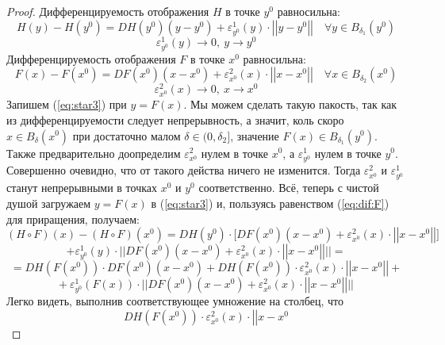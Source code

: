 \documentclass[11pt]{article}
\begin{document}
\begin{proof}
    Дифференцируемость отображения $H$ в точке $ y^0 $ равносильна:
    \begin{equation} \label{eq:star3}
        H(y) - H\left(y^0\right) = DH\left(y^0\right)\left(y - y^0\right) + \varepsilon_{y^0}^1(y) \cdot 
    \left|\left|y - y^0\right|\right| \quad \forall y \in B_{\delta_1}\left(y^0\right)
    \end{equation}
    \[\varepsilon_{y^0}^1(y) \to 0, \ y \to y^0\]
    Дифференцируемость отображения $F$ в точке $ x^0 $ равносильна:
    \begin{equation} \label{eq:dif:F}
        F(x) - F\left(x^0\right) = DF\left(x^0\right)\left(x - x^0\right) + \varepsilon_{x^0}^2(x) \cdot 
    \left|\left|x - x^0\right|\right| \quad \forall x \in B_{\delta_2}\left(x^0\right)
    \end{equation}
    \[\varepsilon_{x^0}^2(x) \to 0, \ x \to x^0\]
    Запишем (\ref{eq:star3}) при $y = F(x)$. Мы можем сделать такую пакость, так как из дифференцируемости следует 
    непрерывность, а значит, коль скоро $x \in B_\delta\left(x^0\right)$ при достаточно малом $\delta \in (0, \delta_2]$, значение $F(x) \in B_{\delta_1}\left(y^0\right)$.
    \\
    Также предварительно доопределим $\varepsilon_{x^0}^2$ нулем в точке $x^0$, а $\varepsilon_{y^0}^1$
    нулем в точке $y^0$. Совершенно очевидно, что от такого действа ничего не изменится. Тогда $\varepsilon_{x^0}^2$ и $\varepsilon_{y^0}^1$ станут непрерывными в точках
    $x^0$ и $y^0$ соответственно.
    Всё, теперь с чистой душой загружаем $y = F(x)$ в (\ref{eq:star3}) и, пользуясь равенством (\ref{eq:dif:F}) для приращения, получаем:
    \[ \left(H \circ F\right)\left(x\right) - \left(H \circ F\right)\left(x^0\right) = DH\left(y^0\right) \cdot \bigg[DF\left(x^0\right)\left(x - x^0\right) + \varepsilon_{x^0}^2(x) \cdot 
    \left|\left|x - x^0\right|\right|\bigg]\] 
    \[ + \varepsilon_{y^0}^1(y) \cdot \bigg|\bigg|DF\left(x^0\right)\left(x - x^0\right) + 
    \varepsilon_{x^0}^2(x) \cdot \left|\left|x - x^0\right|\right|\bigg|\bigg| = \]
    \[= DH\left(F\left(x^0\right)\right) \cdot DF\left(x^0\right)\left(x - x^0\right) + DH\left(F\left(x^0\right)\right) \cdot \varepsilon_{x^0}^2(x) \cdot \left|\left|x - x^0\right|\right| +\]
    \[+ \ \varepsilon_{y^0}^1(F(x)) \cdot \bigg|\bigg|DF\left(x^0\right)\left(x - x^0\right) + 
    \varepsilon_{x^0}^2(x) \cdot \left|\left|x - x^0\right|\right|\bigg|\bigg|\]
    Легко видеть, выполнив соответствующее умножение на столбец, что 
    \[DH\left(F\left(x^0\right)\right) \cdot \varepsilon_{x^0}^2(x) \cdot \left|\left|x - x^0
\]
\end{proof}
\end{document}

